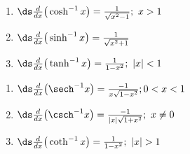 \setboxwidth{120pt}
\noindent%
\begin{minipage}{\specialboxlength}
{%
\begin{minipage}[t]{.45\specialboxlength}
\begin{enumerate}
\item $\ds\frac{d}{dx}\big(\cosh^{-1} x\big) = \frac{1}{\sqrt{x^2-1}};\ x>1$
\item $\ds\frac{d}{dx}\big(\sinh^{-1} x\big) = \frac{1}{\sqrt{x^2+1}}$
\item $\ds\frac{d}{dx}\big(\tanh^{-1} x\big) = \frac{1}{1-x^2};\ |x|<1$
\end{enumerate}
\end{minipage}
\begin{minipage}[t]{.55\specialboxlength}
\begin{enumerate}\addtocounter{enumi}{3}
\item $\ds\frac{d}{dx}\big(\sech^{-1} x\big) = \frac{-1}{x\sqrt{1-x^2}}; 0<x<1$
\item $\ds\frac{d}{dx}\big(\csch^{-1} x\big) = \frac{-1}{|x|\sqrt{1+x^2}};\ x\neq0$
\item $\ds\frac{d}{dx}\big(\coth^{-1} x\big) = \frac{1}{1-x^2};\ |x|>1$
\end{enumerate}
\end{minipage}
}
\end{minipage}
\restoreboxwidth
\\

